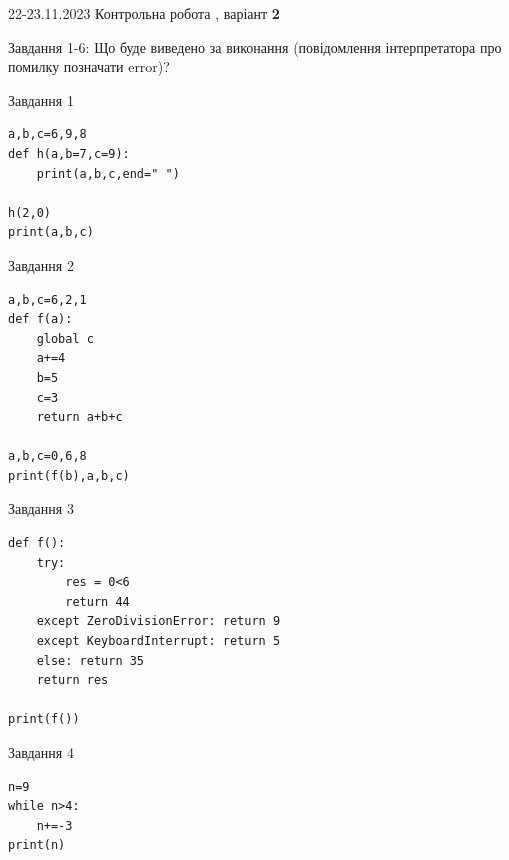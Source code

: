 \documentclass[12pt, ukrainian]{article}
\begin{document}
{{22-23.11.2023 Контрольна робота , варіант  \No \textbf { 2 }\par}}
{

Завдання 1-6: Що буде виведено за виконання (повідомлення інтерпретатора про помилку позначати error)?


\begin{minipage}[t]{9.7cm}                
{\begin{center}Завдання {1}\end{center}}
\begin{verbatim}
a,b,c=6,9,8
def h(a,b=7,c=9):
    print(a,b,c,end=" ")

h(2,0)
print(a,b,c)
\end{verbatim}     
\end{minipage}
\vline \hspace{8mm}
\begin{minipage}[t]{8.0cm}                
{\begin{center}Завдання {2}\end{center}}
\begin{verbatim}
a,b,c=6,2,1
def f(a):
    global c
    a+=4
    b=5
    c=3
    return a+b+c

a,b,c=0,6,8
print(f(b),a,b,c)
\end{verbatim}     
\end{minipage}

\vspace{15mm}
\begin{minipage}[t]{9.7cm}                
{\begin{center}Завдання {3}\end{center}}
\begin{verbatim}
def f():
    try:
        res = 0<6
        return 44
    except ZeroDivisionError: return 9
    except KeyboardInterrupt: return 5
    else: return 35
    return res

print(f())
\end{verbatim}     
\end{minipage}
\vline \hspace{8mm}
\begin{minipage}[t]{8.0cm}                
{\begin{center}Завдання {4}\end{center}}
\begin{verbatim}
n=9
while n>4:
    n+=-3
print(n)
\end{verbatim}     
\end{minipage}

}
\end{document}
